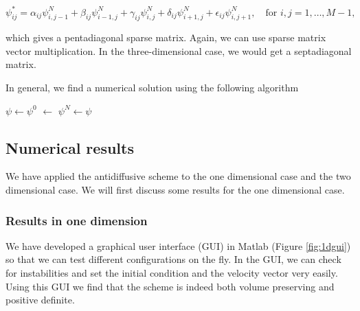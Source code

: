 \documentclass[10pt, a4paper]{article}
\begin{document}
\begin{equation*}
\psi_{ij}^* = \alpha_{ij} \psi_{i,j-1}^N + \beta_{ij} \psi_{i-1,j}^N +\gamma_{ij} \psi_{i,j}^N +\delta_{ij} \psi_{i+1,j}^N + \epsilon_{ij} \psi_{i,j+1}^N, \quad \text{for } i,j=1,\ldots,M-1,
\end{equation*}

which gives a pentadiagonal sparse matrix. Again, we can use sparse matrix vector multiplication. In the three-dimensional case, we would get a septadiagonal matrix.

In general, we find a numerical solution using the following algorithm

\IncMargin{1em}
\begin{algorithm}[H]
\BlankLine
$\psi \leftarrow \psi^0$\;
\Mone $\leftarrow$ \;
$\psi^N \leftarrow \psi$\;
\end{algorithm}
\DecMargin{1em}





\subsection{Numerical results}
We have applied the antidiffusive scheme to the one dimensional case and the two dimensional case. We will first discuss some results for the one dimensional case.


\subsubsection{Results in one dimension}
We have developed a graphical user interface (GUI) in Matlab (Figure \ref{fig:1dgui}) so that we can test different configurations on the fly. In the GUI, we can check for instabilities and set the initial condition and the velocity vector very easily. Using this GUI we find that the scheme is indeed both volume preserving and positive definite.
\end{document}
